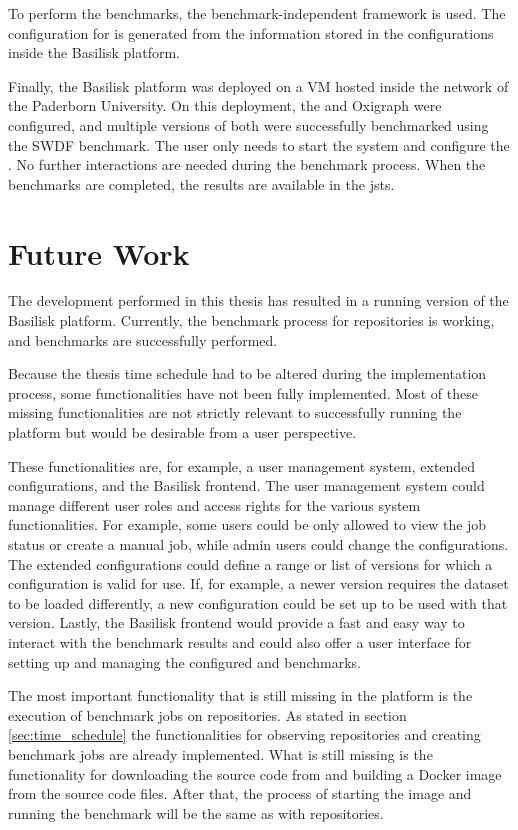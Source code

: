 To perform the benchmarks, the benchmark-independent \iguana{} framework is used.
The configuration for \iguana{} is generated from the information stored in the \ts{} configurations inside the Basilisk platform.

Finally, the Basilisk platform was deployed on a VM hosted inside the network of the Paderborn University.
On this deployment, the \tentris{} and Oxigraph \tsp{} were configured, and multiple versions of both \tsp{} were successfully benchmarked using the SWDF benchmark.
The user only needs to start the system and configure the \tsp{}.
No further interactions are needed during the benchmark process.
When the benchmarks are completed, the results are available in the \acl{jsts}.



\section{Future Work}
\label{sec:future_work}
The development performed in this thesis has resulted in a running version of the Basilisk platform.
Currently, the benchmark process for \dockh{} repositories is working, and benchmarks are successfully performed.

Because the thesis time schedule had to be altered during the implementation process, some functionalities have not been fully implemented.
Most of these missing functionalities are not strictly relevant to successfully running the platform but would be desirable from a user perspective.

These functionalities are, for example, a user management system, extended \ts{} configurations, and the Basilisk frontend.
The user management system could manage different user roles and access rights for the various system functionalities.
For example, some users could be only allowed to view the job status or create a manual job, while admin users could change the \ts{} configurations.
The extended \ts{} configurations could define a range or list of versions for which a configuration is valid for use.
If, for example, a newer \ts{} version requires the dataset to be loaded differently, a new configuration could be set up to be used with that version.
Lastly, the Basilisk frontend would provide a fast and easy way to interact with the benchmark results and could also offer a user interface for setting up and managing the configured \ts{} and benchmarks.

The most important functionality that is still missing in the platform is the execution of benchmark jobs on \gh{} repositories.
As stated in section \ref{sec:time_schedule} the functionalities for observing \gh{} repositories and creating benchmark jobs are already implemented.
What is still missing is the functionality for downloading the source code from \gh{} and building a Docker image from the source code files.
After that, the process of starting the image and running the benchmark will be the same as with \dockh{} repositories.





